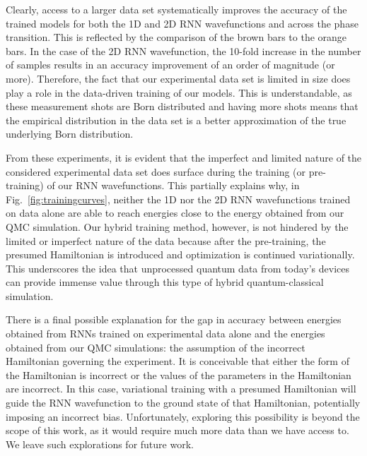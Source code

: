 \documentclass[twocolumn,
                showpacs,
                nofootinbib,
                nobibnotes,
                aps,
                superscriptaddress,
                amssymb,
                amsmath,
                floatfix,
                reprint,
                prx, 
                notitlepage,
                showkeys,
                10pt,
		]{revtex4-2}
\begin{document}
Clearly, access to a larger data set systematically improves the accuracy of the trained models for both the 1D and 2D RNN wavefunctions and across the phase transition. This is reflected by the comparison of the brown bars to the orange bars. In the case of the 2D RNN wavefunction, the 10-fold increase in the number of samples results in an accuracy improvement of an order of magnitude (or more). Therefore, the fact that our experimental data set is limited in size does play a role in the data-driven training of our models. This is understandable, as these measurement shots are Born distributed and having more shots means that the empirical distribution in the data set is a better approximation of the true underlying Born distribution. 

From these experiments, it is evident that the imperfect and limited nature of the considered experimental data set does surface during the training (or pre-training) of our RNN wavefunctions. This partially explains why, in Fig.~\ref{fig:trainingcurves}, neither the 1D nor the 2D RNN wavefunctions trained on data alone are able to reach energies close to the energy obtained from our QMC simulation. Our hybrid training method, however, is not hindered by the limited or imperfect nature of the data because after the pre-training, the presumed Hamiltonian is introduced and optimization is continued variationally. This underscores the idea that unprocessed quantum data from today's devices can provide immense value through this type of hybrid quantum-classical simulation.


There is a final possible explanation for the gap in accuracy between energies obtained from RNNs trained on experimental data alone and the energies obtained from our QMC simulations: the assumption of the incorrect Hamiltonian governing the experiment. It is conceivable that either the form of the Hamiltonian is incorrect or the values of the parameters in the Hamiltonian are incorrect. In this case, variational training with a presumed Hamiltonian will guide the RNN wavefunction to the ground state of that Hamiltonian, potentially imposing an incorrect bias. Unfortunately, exploring this possibility is beyond the scope of this work, as it would require much more data than we have access to. We leave such explorations for future work.
\end{document}
